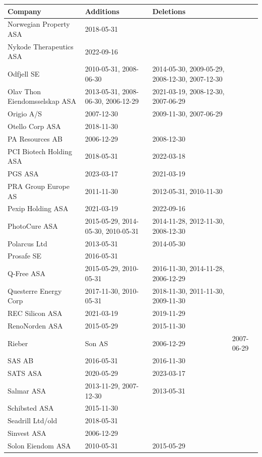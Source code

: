 \begin{table}[H]
\centering
\begin{tabularx}{\textwidth}{XXX}
\toprule
Company & Additions & Deletions \\ 
\midrule
Norwegian Property ASA & 2018-05-31 & \\
Nykode Therapeutics ASA & 2022-09-16 & \\
Odfjell SE & 2010-05-31, 2008-06-30 & 2014-05-30, 2009-05-29, 2008-12-30, 2007-12-30 \\
Olav Thon Eiendomsselskap ASA & 2013-05-31, 2008-06-30, 2006-12-29 & 2021-03-19, 2008-12-30, 2007-06-29 \\
Origio A/S & 2007-12-30 & 2009-11-30, 2007-06-29 \\
Otello Corp ASA & 2018-11-30 & \\
PA Resources AB & 2006-12-29 & 2008-12-30 \\
PCI Biotech Holding ASA & 2018-05-31 & 2022-03-18 \\
PGS ASA & 2023-03-17 & 2021-03-19 \\
PRA Group Europe AS & 2011-11-30 & 2012-05-31, 2010-11-30 \\
Pexip Holding ASA & 2021-03-19 & 2022-09-16 \\
PhotoCure ASA & 2015-05-29, 2014-05-30, 2010-05-31 & 2014-11-28, 2012-11-30, 2008-12-30 \\
Polarcus Ltd & 2013-05-31 & 2014-05-30 \\
Prosafe SE & 2016-05-31 & \\
Q-Free ASA & 2015-05-29, 2010-05-31 & 2016-11-30, 2014-11-28, 2006-12-29 \\
Questerre Energy Corp & 2017-11-30, 2010-05-31 & 2018-11-30, 2011-11-30, 2009-11-30 \\
REC Silicon ASA & 2021-03-19 & 2019-11-29 \\
RenoNorden ASA & 2015-05-29 & 2015-11-30 \\
Rieber & Son AS & 2006-12-29 & 2007-06-29 \\
SAS AB & 2016-05-31 & 2016-11-30 \\
SATS ASA & 2020-05-29 & 2023-03-17 \\
Salmar ASA & 2013-11-29, 2007-12-30 & 2013-05-31 \\
Schibsted ASA & 2015-11-30 & \\
Seadrill Ltd/old & 2018-05-31 & \\
Sinvest ASA & 2006-12-29 & \\
Solon Eiendom ASA & 2010-05-31 & 2015-05-29 \\
\bottomrule
\end{tabularx}
\end{table}


